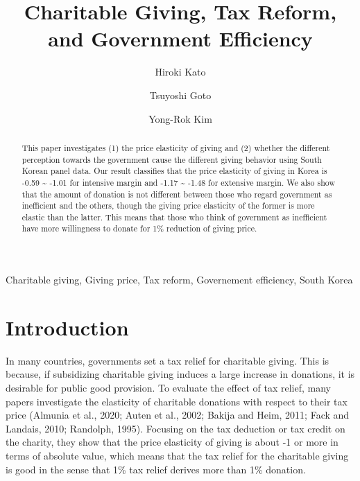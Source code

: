\documentclass[ review  , 3p ]{elsarticle}
\begin{document}
  \begin{frontmatter}

    \title{Charitable Giving, Tax Reform, and Government Efficiency}
            \author[Osaka University]{
      Hiroki Kato 
       \corref{*} }
        \author[Chiba University]{
      Tsuyoshi Goto 
      }
        \author[Kobe University]{
      Yong-Rok Kim 
      }
            \address[Osaka University]{Graduate School of Economics, Osaka University, Japan}
        \address[Chiba University]{Graduate School of Social Sciences, Chiba University, Japan}
        \address[Kobe University]{Graduate School of Economics, Kobe University, Japan}
      
        \begin{abstract}
      This paper investigates (1) the price elasticity of giving and (2) whether the different perception towards the government cause the different giving behavior using South Korean panel data. Our result classifies that the price elasticity of giving in Korea is -0.59 \textasciitilde{} -1.01 for intensive margin and -1.17 \textasciitilde{} -1.48 for extensive margin. We also show that the amount of donation is not different between those who regard government as inefficient and the others, though the giving price elasticity of the former is more elastic than the latter. This means that those who think of government as inefficient have more willingness to donate for 1\% reduction of giving price.
    \end{abstract}
      
        \begin{keyword}
      Charitable giving, Giving price, Tax reform, Governement efficiency, South Korea
    \end{keyword}
    
  \end{frontmatter}

  \hypertarget{introduction}{%
  \section{Introduction}\label{introduction}}

  In many countries, governments set a tax relief for charitable giving. This is because, if subsidizing charitable giving induces a large increase in donations, it is desirable for public good provision. To evaluate the effect of tax relief, many papers investigate the elasticity of charitable donations with respect to their tax price (Almunia et al., 2020; Auten et al., 2002; Bakija and Heim, 2011; Fack and Landais, 2010; Randolph, 1995). Focusing on the tax deduction or tax credit on the charity, they show that the price elasticity of giving is about -1 or more in terms of absolute value, which means that the tax relief for the charitable giving is good in the sense that 1\% tax relief derives more than 1\% donation.
\end{document}
